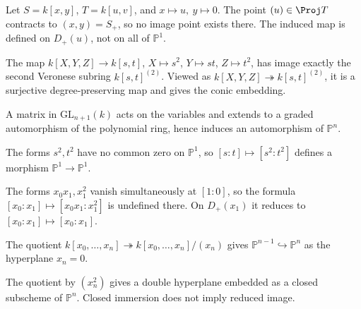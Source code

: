 \begin{example}\label{ex:vi38-01}
Let \(S=k[x,y]\), \(T=k[u,v]\), and \(x\mapsto u,\ y\mapsto0\).  The point \((u)\in\Proj T\) contracts to \((x,y)=S_+\), so no image point exists there.  The induced map is defined on \(D_+(u)\), not on all of \(\mathbb P^1\).
\end{example}

\begin{example}\label{ex:vi38-02}
The map \(k[X,Y,Z]\to k[s,t]\), \(X\mapsto s^2\), \(Y\mapsto st\), \(Z\mapsto t^2\), has image exactly the second Veronese subring \(k[s,t]^{(2)}\).  Viewed as \(k[X,Y,Z]\twoheadrightarrow k[s,t]^{(2)}\), it is a surjective degree-preserving map and gives the conic embedding.
\end{example}

\begin{example}\label{ex:vi38-03}
A matrix in \(\mathrm{GL}_{n+1}(k)\) acts on the variables and extends to a graded automorphism of the polynomial ring, hence induces an automorphism of \(\mathbb P^n\).
\end{example}

\begin{example}\label{ex:vi38-04}
The forms \(s^2,t^2\) have no common zero on \(\mathbb P^1\), so
\([s:t]\mapsto[s^2:t^2]\) defines a morphism \(\mathbb P^1\to\mathbb P^1\).
\end{example}

\begin{example}\label{ex:vi38-05}
The forms \(x_0x_1,x_1^2\) vanish simultaneously at \([1:0]\), so the formula \([x_0:x_1]\mapsto[x_0x_1:x_1^2]\) is undefined there.  On \(D_+(x_1)\) it reduces to \([x_0:x_1]\mapsto[x_0:x_1]\).
\end{example}

\begin{example}\label{ex:vi38-06}
The quotient \(k[x_0,\ldots,x_n]\twoheadrightarrow k[x_0,\ldots,x_n]/(x_n)\) gives \(\mathbb P^{n-1}\hookrightarrow\mathbb P^n\) as the hyperplane \(x_n=0\).
\end{example}

\begin{example}\label{ex:vi38-07}
The quotient by \((x_n^2)\) gives a double hyperplane embedded as a closed subscheme of \(\mathbb P^n\).  Closed immersion does not imply reduced image.
\end{example}

